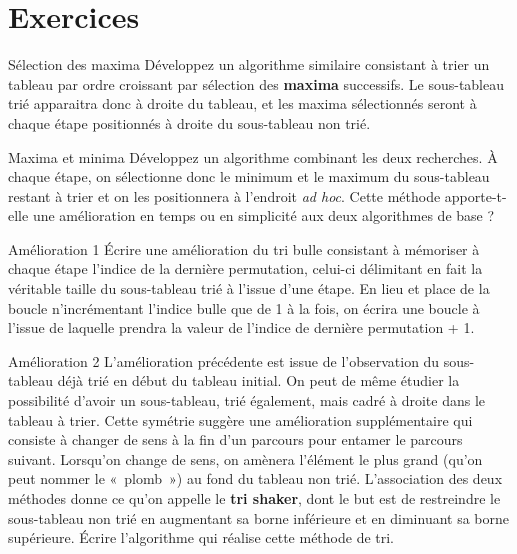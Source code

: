\section{	Exercices}

	\begin{Exercice}{Sélection des maxima}
		Développez un algorithme similaire consistant à trier un tableau par
		ordre croissant par sélection des \textbf{maxima} successifs. Le
		sous-tableau trié apparaitra donc à droite du tableau, et les maxima
		sélectionnés seront à chaque étape positionnés à droite du sous-tableau
		non trié. 
	\end{Exercice}
	
	\begin{Exercice}{Maxima et minima}
		Développez un algorithme combinant les deux recherches. À chaque étape,
		on sélectionne donc le minimum et le maximum du sous-tableau restant à
		trier et on les positionnera à l’endroit \textit{ad hoc}. 
		Cette méthode apporte-t-elle une amélioration en temps ou
		en simplicité aux deux algorithmes de base ?
	\end{Exercice}

	\begin{Exercice}{Amélioration 1}
			Écrire une amélioration du tri bulle consistant à mémoriser à chaque
			étape l’indice de la dernière permutation, celui-ci délimitant en fait
			la véritable taille du sous-tableau trié à l’issue d’une étape. En lieu
			et place de la boucle  n’incrémentant l’indice
			bulle que de 1 à la fois, on écrira une boucle  à l’issue de laquelle  prendra la
			valeur de l’indice de dernière permutation + 1.
	\end{Exercice}
	
	\begin{Exercice}{Amélioration 2}
			L’amélioration précédente est issue de l’observation du sous-tableau
			déjà trié en début du tableau initial. On peut de même étudier la
			possibilité d’avoir un sous-tableau, trié également, mais cadré à
			droite dans le tableau à trier. Cette symétrie suggère une amélioration
			supplémentaire qui consiste à changer de sens à la fin d’un parcours
			pour entamer le parcours suivant. Lorsqu’on change de sens, on amènera
			l’élément le plus grand (qu’on peut nommer le «~plomb~») au fond du
			tableau non trié. L’association des deux méthodes donne ce qu’on
			appelle le \textbf{tri shaker}, dont le but est de restreindre le
			sous-tableau non trié en augmentant sa borne inférieure et en diminuant
			sa borne supérieure. Écrire l’algorithme qui réalise cette méthode de
			tri.
	\end{Exercice}
	
